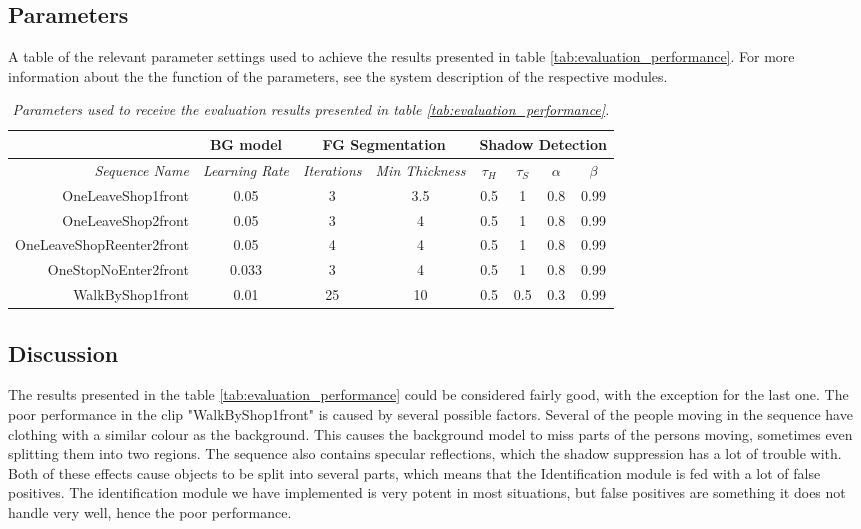 \subsection{Parameters}
A table of the relevant parameter settings used to achieve the results presented in table \ref{tab:evaluation_performance}. For more information about the the function of the parameters, see the system description of the respective modules.
\begin{table}[h]
\centering
	\begin{tabular}{r | c || c | c || c | c | c | c }
	&	\multicolumn{1}{|c||}{BG model} & \multicolumn{2}{c||}{FG Segmentation} & \multicolumn{4}{c|}{Shadow Detection} \\
		\hline
		\emph{Sequence Name} & \emph{Learning Rate} & \emph{Iterations} & \emph{Min Thickness} &\emph{$\tau_H$} & \emph{$\tau_S$} & \emph{$\alpha$} & \emph{$\beta$}\\ 
		\hline \hline
		OneLeaveShop1front			& 0.05 		& 3 & 3.5 	& 0.5 & 1 & 0.8 & 0.99\\
		OneLeaveShop2front			& 0.05 		& 3 & 4 	& 0.5 & 1 & 0.8 & 0.99\\
		OneLeaveShopReenter2front	& 0.05		& 4 & 4 	& 0.5 & 1 & 0.8 & 0.99\\
		OneStopNoEnter2front 		& 0.033		& 3 & 4 	& 0.5 & 1 & 0.8 & 0.99\\
		WalkByShop1front 			& 0.01	 	& 25 & 10 	& 0.5 & 0.5 & 0.3 & 0.99\\
	\end{tabular}
	\caption{\textit{Parameters used to receive the evaluation results presented in table \ref{tab:evaluation_performance}.}}
	\label{tab:evaluation_parameters}
\end{table}

\subsection{Discussion}
The results presented in the table \ref{tab:evaluation_performance} could be considered fairly good, with the exception for the last one. The poor performance in the clip "WalkByShop1front" is caused by several possible factors. Several of the people moving in the sequence have clothing with a similar colour as the background. This causes the background model to miss parts of the persons moving, sometimes even splitting them into two regions. The sequence also contains specular reflections, which the shadow suppression has a lot of trouble with. Both of these effects cause objects to be split into several parts, which means that the Identification module is fed with a lot of false positives. The identification module we have implemented is very potent in most situations, but false positives are something it does not handle very well, hence the poor performance.


